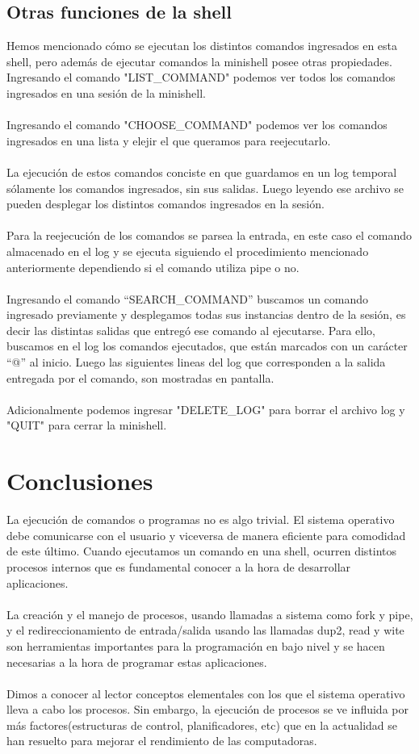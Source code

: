 \documentclass[11pt]{article}
\begin{document}
\subsection{Otras funciones de la shell}
Hemos mencionado cómo se ejecutan los distintos comandos ingresados en esta shell, pero además de ejecutar comandos la minishell posee otras propiedades.\\
Ingresando el comando "LIST\_COMMAND" podemos ver todos los comandos ingresados en una sesión de la minishell.\\\\
Ingresando el comando "CHOOSE\_COMMAND" podemos ver los comandos ingresados en una lista y elejir el que queramos para reejecutarlo.\\\\
La ejecución de estos comandos conciste en que guardamos en un log temporal sólamente los comandos ingresados, sin sus salidas. Luego leyendo ese archivo se pueden desplegar los distintos comandos ingresados en la sesión.\\\\
Para la reejecución de los comandos se parsea la entrada, en este caso el comando almacenado en el log y se ejecuta siguiendo el procedimiento mencionado anteriormente dependiendo si el comando utiliza pipe o no.\\\\
Ingresando el comando “SEARCH\_COMMAND” buscamos un comando ingresado previamente y desplegamos todas sus instancias dentro de la sesión, es decir las distintas salidas que entregó ese comando al ejecutarse. 
Para ello, buscamos en el log los comandos ejecutados, que están marcados con un carácter “@” al inicio. Luego las siguientes lineas del log  que corresponden a la salida entregada por el comando, son mostradas en pantalla.\\\\
Adicionalmente podemos ingresar "DELETE\_LOG" para borrar el archivo log y "QUIT" para cerrar la minishell.
\newpage
\section{Conclusiones}
La ejecución de comandos o programas no es algo trivial. El sistema operativo debe comunicarse con el usuario y viceversa de manera eficiente para comodidad de este último. Cuando ejecutamos un comando en una shell, ocurren distintos procesos internos que es fundamental conocer a la hora de desarrollar aplicaciones.\\\\
La creación y el manejo de procesos, usando llamadas a sistema como fork y pipe, y el redireccionamiento de entrada/salida usando las llamadas dup2, read y wite son herramientas importantes para la programación en bajo nivel y se hacen necesarias a la hora de programar estas aplicaciones.\\\\
Dimos a conocer al lector conceptos elementales con los que el sistema operativo lleva a cabo los procesos. Sin embargo, la ejecución de procesos se ve influida por más factores(estructuras de control, planificadores, etc) que en la actualidad se han resuelto para mejorar el rendimiento de las computadoras.
\end{document}
